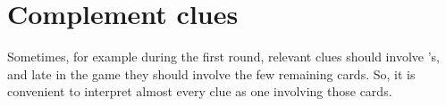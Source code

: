 \documentclass[a4paper]{article}
\theoremstyle{plain}
\theoremstyle{definition}
\newtheorem{example}[theorem]{Example}
\begin{document}
%	
%	
%
%	
%	
%	
%	
%
%	
%	
%	
%	
%


\section{Complement clues}

Sometimes, for example during the first round, relevant clues should involve 's, and late in the game they should involve the few remaining cards. So, it is convenient to interpret almost every clue as one involving those cards.
\end{document}
